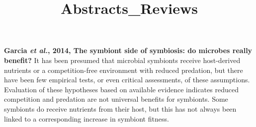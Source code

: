 \documentclass[11pt]{article}
\title{Abstracts_Reviews}
\author{}
\date{}
\begin{document}
\begin{sloppypar}
\maketitle
\linenumbers

\textbf{Garcia \textit{et al.}, 2014, The symbiont side of symbiosis: do microbes really benefit?} \newline
It has been presumed that microbial symbionts receive host-derived nutrients or a competition-free environment with reduced predation, but there have been few empirical tests, or even critical assessments, of these assumptions. 
Evaluation of these hypotheses based on available evidence indicates reduced competition and predation are not universal benefits for symbionts. 
Some symbionts do receive nutrients from their host, but this has not always been linked to a corresponding increase in symbiont fitness.

      

  
\end{sloppypar}
\end{document}
